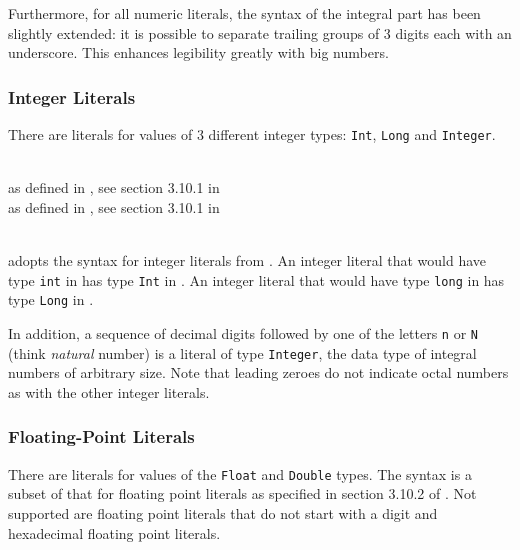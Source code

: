Furthermore, for all numeric literals, the syntax of the integral part has been slightly extended: it is possible to separate trailing groups of 3 digits each with an underscore. This enhances legibility greatly with big numbers.


\subsubsection{Integer Literals}

There are literals for values of 3 different integer types: \texttt{Int}, \texttt{Long} and \texttt{Integer}.

\begin{flushleft}
  \oder{}  \oder{} \\
 as defined in \java{}, see section 3.10.1 in \cite{langspec3}\\
 as defined in \java{}, see section 3.10.1 in \cite{langspec3}\\
  \\
\end{flushleft}

\frege{} adopts the syntax for integer literals from \java{}. An integer literal that would have type \texttt{int} in \java{} has type \texttt{Int} in \frege{}. An integer literal that would have type \texttt{long} in \java{} has type \texttt{Long} in \frege{}.

In addition, a sequence of decimal digits followed by one of the letters \texttt{n} or \texttt{N} (think \emph{natural} number) is a literal of type \texttt{Integer}, the data type of integral numbers of arbitrary size. Note that leading zeroes do not indicate octal numbers as with the other integer literals.


\subsubsection{Floating-Point Literals}

There are literals for values of the \texttt{Float} and \texttt{Double} types. The syntax is a subset of that for \java{} floating point literals as specified in section 3.10.2 of \cite{langspec3}. Not supported are floating point literals that do not start with a digit and hexadecimal floating point literals.

